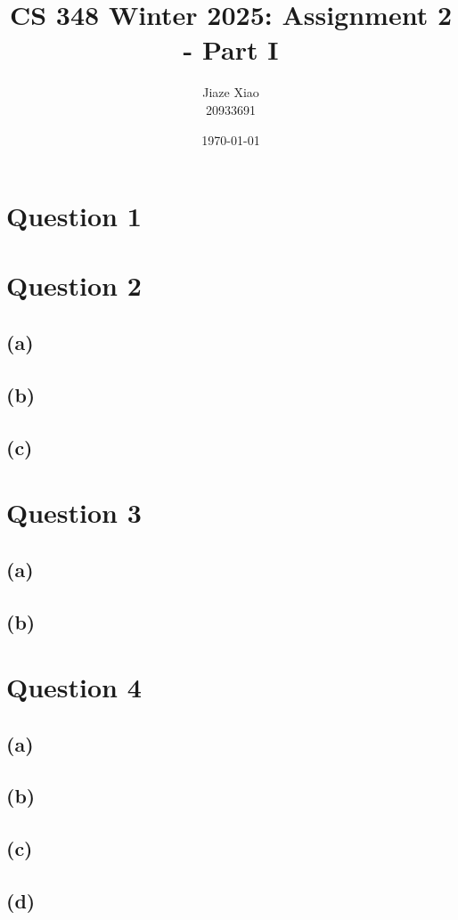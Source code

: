 \documentclass{article}
\title{\textbf{CS 348 Winter 2025: Assignment 2 - Part I}}
\author{Jiaze Xiao \\ 20933691}
\date{\today}
\begin{document}
\maketitle

\section*{Question 1}

\newpage
\section*{Question 2}
\subsection*{(a)}

\newpage
\subsection*{(b)}

\newpage
\subsection*{(c)}

\newpage
\section*{Question 3}
\subsection*{(a)}

\subsection*{(b)}

\newpage
\section*{Question 4}
\subsection*{(a)}

\subsection*{(b)}

\newpage
\subsection*{(c)}

\subsection*{(d)}

\newpage
\end{document}
